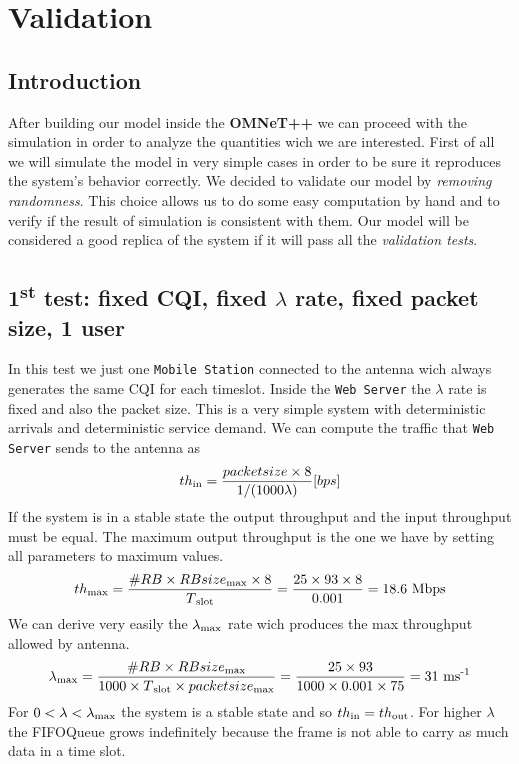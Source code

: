\chapter{Validation}

\section{Introduction}
After building our model inside the \textbf{OMNeT++} we can proceed with the simulation in order to analyze the quantities wich we are interested. First of all we will simulate the model in very simple cases in order to be sure it reproduces the system's behavior correctly. We decided to validate our model by \textit{removing randomness}. This choice allows us to do some easy computation by hand and to verify if the result of simulation is consistent with them. Our model will be considered a good replica of the system if it will pass all the \textit{validation tests}.

\section{1\textsuperscript{st} test: fixed CQI, fixed \(\lambda\) rate, fixed packet size, 1 user}
In this test we just one \texttt{Mobile Station} connected to the antenna wich always generates the same CQI for each timeslot. Inside the \texttt{Web Server} the \(\lambda\) rate is fixed and also the packet size. This is a very simple system with deterministic arrivals and deterministic service demand. We can compute the traffic that \texttt{Web Server} sends to the antenna as \[ th\textsubscript{in} = \frac{packetsize \times 8}{1/(1000\lambda)} \lbrack bps \rbrack \] 
If the system is in a stable state the output throughput and the input throughput must be equal. The maximum output throughput is the one we have by setting all parameters to maximum values. \[ th\textsubscript{max} = \frac{\#RB \times RBsize\textsubscript{max} \times 8}{T\textsubscript{slot}} = \frac{25 \times 93 \times 8}{0.001} = 18.6 \textnormal{ Mbps} \] We can derive very easily the \(\lambda\textsubscript{max}\) rate wich produces the max throughput allowed by antenna. \[\lambda\textsubscript{max} = \frac{\#RB \times RBsize\textsubscript{max}}{1000 \times T\textsubscript{slot} \times packetsize\textsubscript{max}} = \frac{25 \times 93}{1000 \times 0.001 \times 75} = 31 \textnormal{ ms\textsuperscript{-1}} \] For \( 0<\lambda<\lambda\textsubscript{max} \) the system is a stable state and so \(th\textsubscript{in} = th\textsubscript{out}\). For higher \(\lambda\) the FIFOQueue grows indefinitely because the frame is not able to carry as much data in a time slot.

